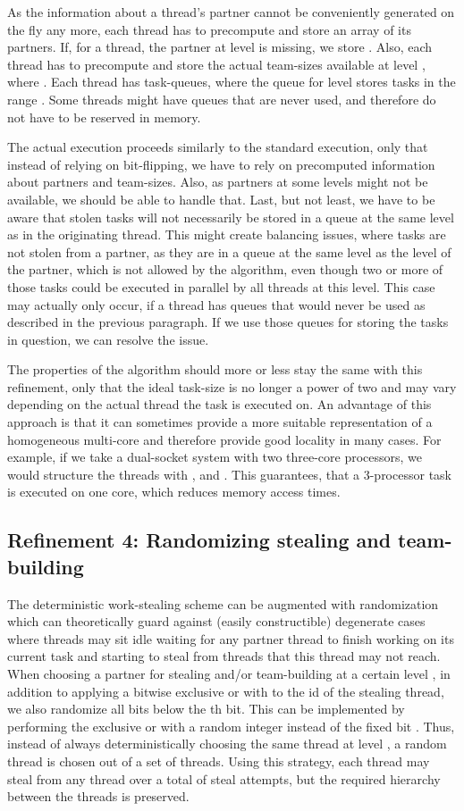 \documentclass[preprint]{sigplanconf}
\begin{document}
As the information about a thread's partner cannot be conveniently
generated on the fly any more, each thread has to precompute and
store an array  of its  partners. If, for a thread, the
partner at level  is missing, we store . Also,
each thread has to precompute and store the actual team-sizes 
available at level , where . Each thread has  task-queues, where the queue for
level  stores tasks in the range . Some threads might have queues that are never used, and
therefore do not have to be reserved in memory.

The actual execution proceeds similarly to the standard execution,
only that instead of relying on bit-flipping, we have to rely on
precomputed information about partners and team-sizes. Also, as
partners at some levels might not be available, we should be able to
handle that. Last, but not least, we have to be aware that stolen
tasks will not necessarily be stored in a queue at the same level as
in the originating thread. This might create balancing issues, where
tasks are not stolen from a partner, as they are in a queue at the
same level as the level of the partner, which is not allowed by the
algorithm, even though two or more of those tasks could be executed in
parallel by all threads at this level. This case may actually only
occur, if a thread has queues that would never be used as described in
the previous paragraph. If we use those queues for storing the tasks
in question, we can resolve the issue. 

The properties of the algorithm should more or less stay the same with
this refinement, only that the ideal task-size is no longer a power of
two and may vary depending on the actual thread the task is executed
on. An advantage of this approach is that it can sometimes provide a
more suitable representation of a homogeneous multi-core and therefore
provide good locality in many cases. For example, if we take a
dual-socket system with two three-core processors, we would structure
the threads with ,  and . This guarantees,
that a 3-processor task is executed on one core, which reduces memory
access times.

\subsection{Refinement 4: Randomizing stealing and team-building}

The deterministic work-stealing scheme can be augmented with
randomization which can theoretically guard against (easily
constructible) degenerate cases where threads may sit idle waiting for
any partner thread to finish working on its current task and starting
to steal from threads that this thread may not reach. When choosing a
partner for stealing and/or team-building at a certain level ,
in addition to applying a bitwise exclusive or with  to the
id of the stealing thread, we also randomize all bits below the
th bit. This can be implemented by performing the exclusive or
with a random integer  instead of the
fixed bit .  Thus, instead of always deterministically
choosing the same thread at level , a random thread is chosen
out of a set of  threads. Using this strategy, each thread
may steal from any thread over a total of  steal attempts, but
the required hierarchy between the threads is preserved.
\end{document}
